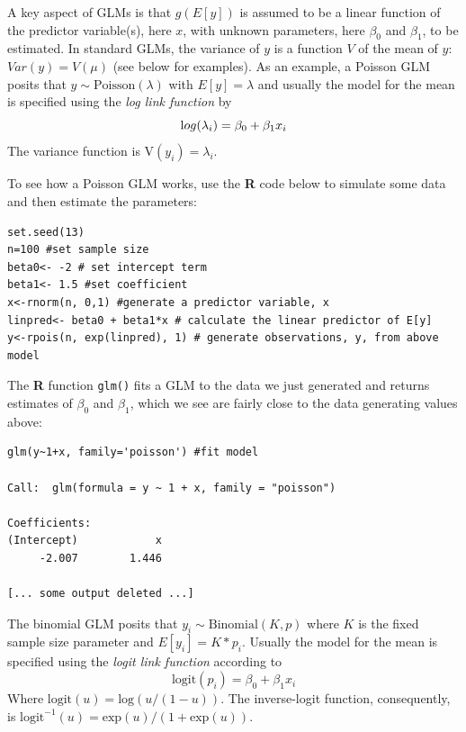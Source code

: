 A key aspect of GLMs is that 
$g(E[y])$ is assumed to be a linear function of the
predictor variable(s), here $x$, with unknown parameters, here $\beta_0$ and $\beta_1$, to be
estimated. In standard GLMs,
the variance of $y$ is a function $V$ of the mean of $y$: $Var(y) =
V(\mu)$ (see below for examples).
As an example, a Poisson GLM posits that $y \sim \mbox{Poisson}(\lambda)$ with $E[y]
=\lambda$ and usually the model for the mean is specified using the
{\it log link function} by
\[
{\text log}(\lambda_{i}) = \beta_0 + \beta_{1}  x_{i}
\]
The variance function is $\mbox{V}(y_{i}) = \lambda_{i}$.  

To see how a Poisson GLM works, use the {\bf R} code below to simulate
some data and then estimate the parameters:
\begin{verbatim}
set.seed(13)
n=100 #set sample size
beta0<- -2 # set intercept term
beta1<- 1.5 #set coefficient
x<-rnorm(n, 0,1) #generate a predictor variable, x
linpred<- beta0 + beta1*x # calculate the linear predictor of E[y]
y<-rpois(n, exp(linpred), 1) # generate observations, y, from above model
\end{verbatim} 
The {\bf R} function {\tt glm()} fits a GLM to the data we just
generated and returns estimates of $\beta_0$ and $\beta_1$, which we
see are fairly close to the data generating values above:
\begin{verbatim}
glm(y~1+x, family='poisson') #fit model

Call:  glm(formula = y ~ 1 + x, family = "poisson")

Coefficients:
(Intercept)            x  
     -2.007        1.446  

[... some output deleted ...]
\end{verbatim}

The
binomial GLM posits that $y_{i} \sim \mbox{Binomial}(K,p)$ where $K$
is the fixed sample size parameter and $E[y_{i}] = K*p_{i}$. Usually
the model for the mean is specified using the {\it logit link
  function} according to
\[
 \text {logit}(p_{i}) = \beta_{0} + \beta_{1}  x_{i}
\]
Where $\text {logit}(u) = \text {log}(u/(1-u))$.  The inverse-logit function,
consequently, is $\text {logit}^{-1}(u) =
\text {exp}(u)/(1+\text {exp}(u))$.

